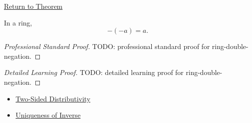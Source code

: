 \newpage
{}
\label{prf:ring-double-negation}

\begin{remark*}[Return]
\hyperref[thm:ring-double-negation]{Return to Theorem}
\end{remark*}

\begin{theorem*}
In a ring,
\[
-(-a)=a.
\]
\end{theorem*}

\begin{proof}[Professional Standard Proof]
\LRAProofBodyStart
TODO: professional standard proof for ring-double-negation.
\end{proof}

\begin{proof}[Detailed Learning Proof]
\LRAProofBodyStart
TODO: detailed learning proof for ring-double-negation.
\end{proof}

\begin{remark*}
\end{remark*}

\begin{dependencies}
\begin{itemize}
  \item \hyperref[def:two-sided-distributivity]{Two-Sided Distributivity}
  \item \hyperref[thm:uniqueness-of-inverse]{Uniqueness of Inverse}
\end{itemize}
\end{dependencies}

\clearpage
